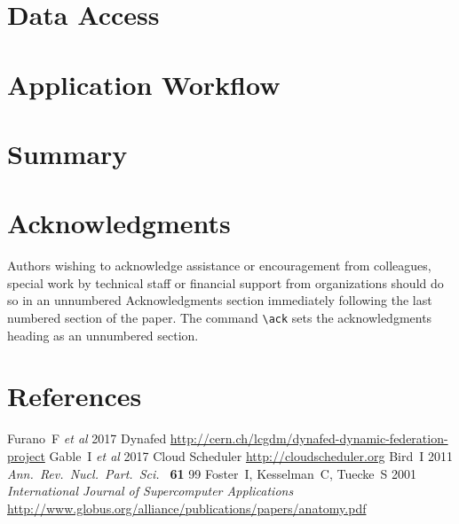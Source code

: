 \documentclass[a4paper]{jpconf}
\begin{document}
\section{Data Access}


\section{Application Workflow}


\section{Summary}


\section*{Acknowledgments}
Authors wishing to acknowledge assistance or encouragement from
colleagues, special work by technical staff or financial support from
organizations should do so in an unnumbered Acknowledgments section
immediately following the last numbered section of the paper. The
command \verb"\ack" sets the acknowledgments heading as an unnumbered
section.


\section*{References}
\begin{thebibliography}{9}
  Furano~F {\it et al}
  2017
  Dynafed
  \url{http://cern.ch/lcgdm/dynafed-dynamic-federation-project}
  Gable~I {\it et al}
  2017
  Cloud Scheduler
  \url{http://cloudscheduler.org}
  Bird~I
  2011
  {\it Ann.\ Rev.\ Nucl.\ Part.\ Sci.\ } {\bf 61} 99
  Foster~I, Kesselman~C, Tuecke~S
  2001
  {\it International Journal of Supercomputer Applications}
  \url{http://www.globus.org/alliance/publications/papers/anatomy.pdf}


\end{thebibliography}
\end{document}
